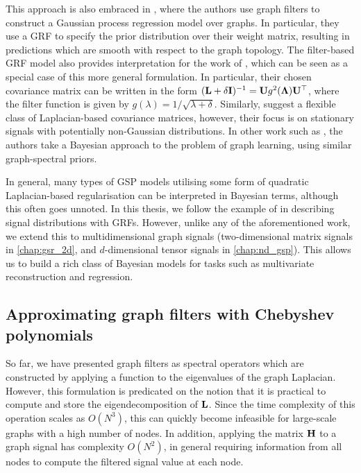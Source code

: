 This approach is also embraced in \cite{Venkitaraman2020}, where the authors use graph filters to construct a Gaussian process regression model over graphs. In particular, they use a GRF to specify the prior distribution over their weight matrix, resulting in predictions which are smooth with respect to the graph topology. The filter-based GRF model also provides interpretation for the work of \cite{Gadde2015}, which can be seen as a special case of this more general formulation. In particular, their chosen covariance matrix can be written in the form $(\mathbf{L} + \delta \mathbf{I})^{-1} = \mathbf{U} g^2(\mathbf{\Lambda}) \mathbf{U}^\top$, where the filter function is given by $g(\lambda) = 1 / \sqrt{\lambda + \delta}$. Similarly, \citep{Perraudin2017} suggest a flexible class of Laplacian-based covariance matrices, however, their focus is on stationary signals with potentially non-Gaussian distributions. In other work such as \cite{Dong2016}, the authors take a Bayesian approach to the problem of graph learning, using similar graph-spectral priors. 

In general, many types of GSP models utilising some form of quadratic Laplacian-based regularisation can be interpreted in Bayesian terms, although this often goes unnoted. In this thesis, we follow the example of \cite{Zhang2015} in describing signal distributions with GRFs. However, unlike any of the aforementioned work, we extend this to multidimensional graph signals (two-dimensional matrix signals in \cref{chap:gsr_2d}, and $d$-dimensional tensor signals in \cref{chap:nd_gsp}). This allows us to build a rich class of Bayesian models for tasks such as multivariate reconstruction and regression. 

\subsection{Approximating graph filters with Chebyshev polynomials}

\label{sec:Chebyshev}

So far, we have presented graph filters as spectral operators which are constructed by applying a function to the eigenvalues of the graph Laplacian. However, this formulation is predicated on the notion that it is practical to compute and store the eigendecomposition of $\mathbf{L}$. Since the time complexity of this operation scales as $O(N^3)$, this can quickly become infeasible for large-scale graphs with a high number of nodes. In addition, applying the matrix $\mathbf{H}$ to a graph signal has complexity $O(N^2)$, in general requiring information from all nodes to compute the filtered signal value at each node. 

